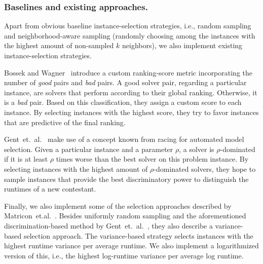 \documentclass[runningheads]{llncs}
\begin{document}
\subsubsection{Baselines and existing approaches.}
\label{sec:sampling1}
Apart from obvious baseline instance-selection strategies, i.e., random sampling and neighborhood-aware sampling (randomly choosing among the instances with the highest amount of non-sampled $k$ neighbors), we also implement existing instance-selection strategies.

Bossek and Wagner~\cite{Bossek021a} introduce a custom ranking-score metric incorporating the number of \emph{good} pairs and \emph{bad} pairs.
A good solver pair, regarding a particular instance, are solvers that perform according to their global ranking.
Otherwise, it is a \emph{bad} pair.
Based on this classification, they assign a custom score to each instance.
By selecting instances with the highest score, they try to favor instances that are predictive of the final ranking.

Gent~et.~al.~\cite{GentHJKMNN14} make use of a concept known from racing for automated model selection.
Given a particular instance and a parameter $\rho$, a solver is $\rho$-dominated if it is at least $\rho$ times worse than the best solver on this problem instance.
By selecting instances with the highest amount of $\rho$-dominated solvers, they hope to sample instances that provide the best discriminatory power to distinguish the runtimes of a new contestant.

Finally, we also implement some of the selection approaches described by Matricon~et.al.~\cite{MatriconAFSH21}.
Besides uniformly random sampling and the aforementioned discrimination-based method by Gent~et.~al.~\cite{GentHJKMNN14}, they also describe a variance-based selection approach.
The variance-based strategy selects instances with the highest runtime variance per average runtime.
We also implement a logarithmized version of this, i.e., the highest log-runtime variance per average log runtime.
 
\end{document}
